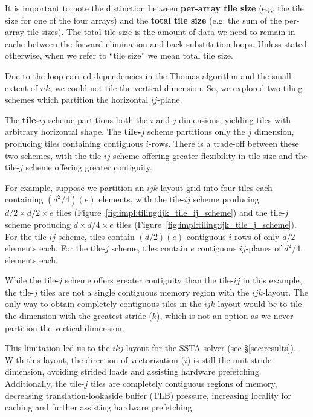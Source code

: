 \documentclass[10pt, conference, compsocconf]{IEEEtran}
\begin{document}
It is important to note the distinction between \textbf{per-array tile size}
  (e.g. the tile size for one of the four arrays) and the
  \textbf{total tile size} (e.g. the sum of the per-array tile sizes).
The total tile size is the amount of data we need to remain in cache between
  the forward elimination and back substitution loops.
Unless stated otherwise, when we refer to ``tile size'' we mean
  total tile size.

Due to the loop-carried dependencies in the Thomas algorithm and the small
  extent of \(nk\), we could not tile the vertical dimension. So, we explored two
  tiling schemes which partition the horizontal \(ij\)-plane.

The \textbf{tile-\(ij\)} scheme partitions both the \(i\) and \(j\) dimensions,
  yielding tiles with arbitrary horizontal shape. 
The \textbf{tile-\(j\)} scheme partitions only the \(j\) dimension, producing
  tiles containing contiguous \(i\)-rows.
There is a trade-off between these two schemes, with the tile-\(ij\) scheme
  offering greater flexibility in tile size and the tile-\(j\) scheme offering
  greater contiguity. 

For example, suppose we partition an \(ijk\)-layout grid into four tiles each
  containing \((d^2/4)(e)\) elements, with the tile-\(ij\) scheme producing
  \(d/2 \times d/2 \times e\) tiles
  (Figure~\ref{fig:impl:tiling:ijk_tile_ij_scheme})
  and the tile-\(j\) scheme producing
  \(d \times d/4 \times e\) tiles
  (Figure~\ref{fig:impl:tiling:ijk_tile_j_scheme}).
For the tile-\(ij\) scheme, tiles contain \((d/2)(e)\) contiguous
  \(i\)-rows of only \(d/2\) elements each.
For the tile-\(j\) scheme, tiles contain \(e\) contiguous \(ij\)-planes of
  \(d^2/4\) elements each.

While the tile-\(j\) scheme offers greater contiguity than the
  tile-\(ij\) in this example, the tile-\(j\) tiles are not a single contiguous
  memory region with the \(ijk\)-layout.
The only way to obtain completely contiguous tiles in the \(ijk\)-layout would
  be to tile the dimension with the greatest stride (\(k\)), which is not an
  option as we never partition the vertical dimension.

This limitation led us to the \(ikj\)-layout for the SSTA solver (see
  \S\ref{sec:results}).
With this layout, the direction of vectorization (\(i\)) is still the unit stride
  dimension, avoiding strided loads and assisting hardware prefetching.
Additionally, the tile-\(j\) tiles are completely contiguous regions of memory,
  decreasing translation-lookaside buffer (TLB) pressure, increasing locality for
  caching and further assisting hardware prefetching.
\end{document}
